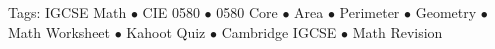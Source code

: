 \documentclass[11pt,a4paper]{article}
\begin{document}
\vspace{14pt}
\begin{center}
  \sffamily\scriptsize\textcolor{textmuted}{
    Tags: IGCSE Math $\bullet$ CIE 0580 $\bullet$ 0580 Core $\bullet$ Area $\bullet$ Perimeter $\bullet$ Geometry $\bullet$ Math Worksheet $\bullet$ Kahoot Quiz $\bullet$ Cambridge IGCSE $\bullet$ Math Revision
  }
\end{center}
\end{document}

